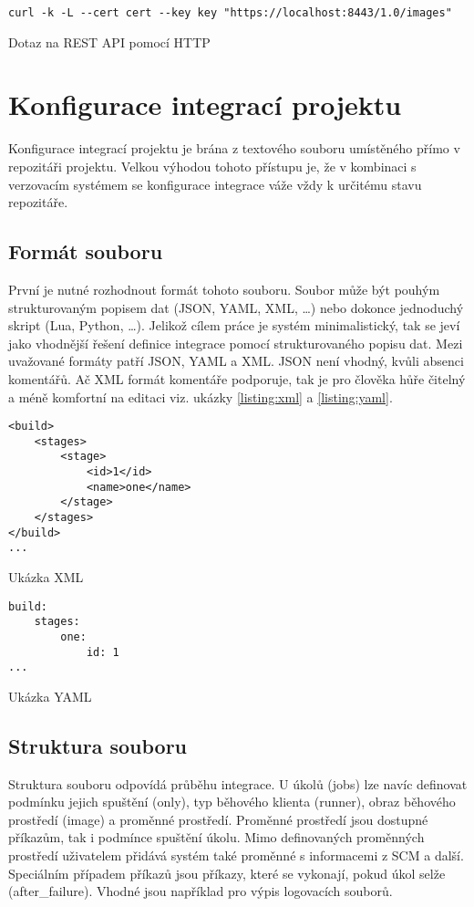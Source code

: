 \begin{listing}[ht]
\begin{verbatim}
curl -k -L --cert cert --key key "https://localhost:8443/1.0/images"
\end{verbatim}
\caption{Dotaz na REST API pomocí HTTP}
\end{listing}

\section{Konfigurace integrací projektu}

Konfigurace integrací projektu je brána z textového souboru umístěného přímo v repozitáři projektu.
Velkou výhodou tohoto přístupu je, že v kombinaci s verzovacím systémem se konfigurace integrace váže vždy k určitému stavu repozitáře.

\subsection{Formát souboru}

První je nutné rozhodnout formát tohoto souboru.
Soubor může být pouhým strukturovaným popisem dat (JSON, YAML, XML, \ldots) nebo dokonce jednoduchý skript (Lua, Python, \ldots).
Jelikož cílem práce je systém minimalistický, tak se jeví jako vhodnější řešení definice integrace pomocí strukturovaného popisu dat.
Mezi uvažované formáty patří JSON, YAML a XML.
JSON není vhodný, kvůli absenci komentářů.
Ač XML formát komentáře podporuje, tak je pro člověka hůře čitelný a méně komfortní na editaci viz. ukázky \ref{listing:xml} a \ref{listing:yaml}.

\begin{listing}[ht]
\begin{verbatim}
<build>
    <stages>
        <stage>
            <id>1</id>
            <name>one</name>
        </stage>
    </stages>
</build>
...
\end{verbatim}
\caption{Ukázka XML}
\label{listing:xml}
\end{listing}

\begin{listing}[ht]
\begin{verbatim}
build:
    stages:
        one:
            id: 1
...
\end{verbatim}
\caption{Ukázka YAML}
\label{listing:yaml}
\end{listing}

\subsection{Struktura souboru}

Struktura souboru odpovídá průběhu integrace.
U úkolů (jobs) lze navíc definovat podmínku jejich spuštění (only), typ běhového klienta (runner), obraz běhového prostředí (image) a proměnné prostředí.
Proměnné prostředí jsou dostupné příkazům, tak i podmínce spuštění úkolu.
Mimo definovaných proměnných prostředí uživatelem přidává systém také proměnné s informacemi z SCM a další.
Speciálním případem příkazů jsou příkazy, které se vykonají, pokud úkol selže (after\_failure).
Vhodné jsou například pro výpis logovacích souborů.
